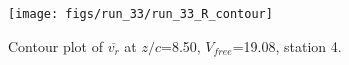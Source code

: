 \begin{figure}[H]
\centering
\texttt{[image: figs/run\_33/run\_33\_R\_contour]}
\caption{Contour plot of $\overline{v_{r}}$ at $z/c$=8.50, $V_{free}$=19.08, station 4.}
\label{fig:run_33_R_contour}
\end{figure}


